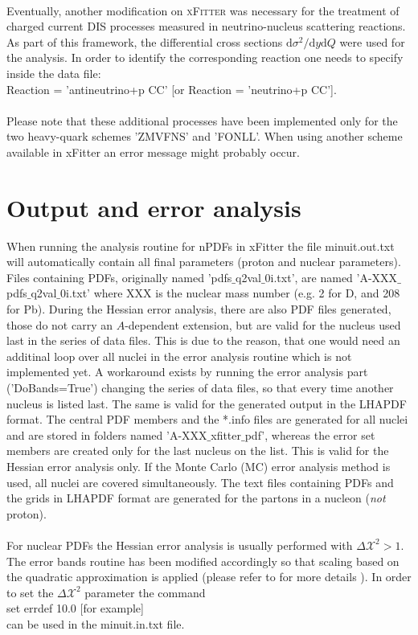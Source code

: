 \documentclass{article}
\begin{document}
\\
Eventually, another modification on \textsc{xFitter} was necessary for the treatment of charged current DIS processes measured in neutrino-nucleus scattering reactions. As part of this framework, the differential cross sections $\mathrm{d}\sigma^2/\mathrm{d}y\mathrm{d}Q$ were used for the analysis. In order to identify the corresponding reaction one needs to specify inside the data file:\\
\hspace*{0.5cm}Reaction = 'antineutrino+p CC' [or Reaction = 'neutrino+p CC'].\\
\\
Please note that these additional processes have been implemented only for the two heavy-quark schemes 'ZMVFNS' and 'FONLL'. When using another scheme available in xFitter an error message might probably occur.


\section{Output and error analysis}

When running the analysis routine for nPDFs in xFitter the file minuit.out.txt will automatically contain all final parameters (proton and nuclear parameters). Files containing PDFs, originally named 'pdfs$\_$q2val$\_$0i.txt', are named 'A-XXX$\_$pdfs$\_$q2val$\_$0i.txt' where XXX is the nuclear mass number (e.g. 2 for D, and 208 for Pb). During the Hessian error analysis, there are also PDF files generated, those do not carry an $A$-dependent extension, but are valid for the nucleus used last in the series of data files. This is due to the reason, that one would need an additinal loop over all nuclei in the error analysis routine which is not implemented yet. A workaround exists by running the error analysis part ('DoBands=True') changing the series of data files, so that every time another nucleus is listed last. The same is valid for the generated output in the LHAPDF format. The central PDF members and the *.info files are generated for all nuclei and are stored in folders named 'A-XXX$\_$xfitter$\_$pdf', whereas the error set members are created only for the last nucleus on the list. This is valid for the Hessian error analysis only. If the Monte Carlo (MC) error analysis method is used, all nuclei are covered simultaneously. The text files containing PDFs and the grids in LHAPDF format are generated for the partons in a nucleon (\textit{not} proton). \\
\\
For nuclear PDFs the Hessian error analysis is usually performed with $\Delta \mathcal{X}^2 >1$. The error bands routine has been modified accordingly so that scaling based on the quadratic approximation is applied (please refer to \cite{tuju19} for more details ). In order to set the $\Delta \mathcal{X}^2$ parameter the command \\
\hspace*{0.5cm} set errdef 10.0 [for example] \\
can be used in the minuit.in.txt file.
\end{document}
